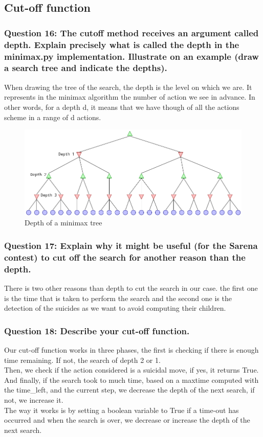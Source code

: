 \documentclass[a4paper,10pt]{article}
\begin{document}
			\subsection{Cut-off function}
				\subsubsection{Question 16: The cutoff method receives an argument called depth. Explain precisely what is called the depth in the minimax.py implementation. Illustrate on an example (draw a search tree and indicate the depths).}
					When drawing the tree of the search, the depth is the level on which we are. It represents in the minimax algorithm the number of action we see in advance. In other words, for a depth d, it means that we have though of all the actions scheme in a range of d actions.\\
					\begin{figure}[h!]
						\centering
							\includegraphics[scale=0.4]{arbre_depth.png}
						\caption{Depth of a minimax tree}
					\end{figure}
				\subsubsection{Question 17: Explain why it might be useful (for the Sarena contest) to cut off the search for another reason than the depth.}
					There is two other reasons than depth to cut the search in our case. the first one is the time that is taken to perform the search and the second one is the detection of the suicides as we want to avoid computing their children.
				\subsubsection{Question 18: Describe your cut-off function.}
					Our cut-off function works in three phases, the first is checking if there is enough time remaining. If not, the search of depth 2 or 1.\\
					Then, we check if the action considered is a suicidal move, if yes, it returns True.\\
					And finally, if the search took to much time, based on a maxtime computed with the time\_left, and the current step, we decrease the depth of the next search, if not, we increase it.\\
					The way it works is by setting a boolean variable to True if a time-out has occurred and when the search is over, we decrease or increase the depth of the next search.
\end{document}
